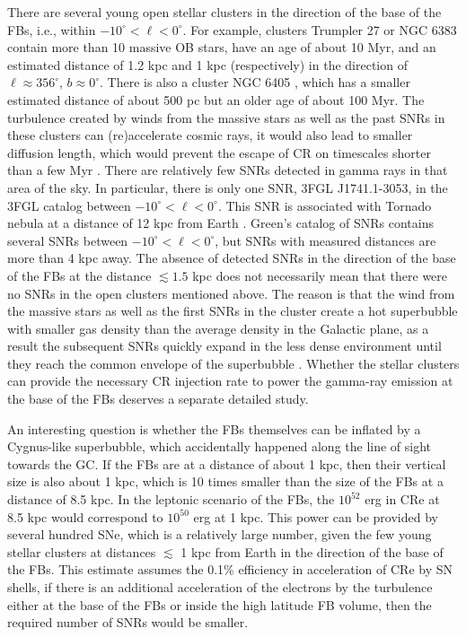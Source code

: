 There are several young open stellar clusters in the direction of the base of the FBs, i.e., within $-10^\circ < \ell  < 0^\circ$.
For example, clusters Trumpler 27 \citep{1977ApJ...215..106M} or NGC 6383 \citep{1978MNRAS.184..661L}
contain more than 10 massive OB stars, have an age of about 10 Myr, and an estimated distance of 1.2 kpc and 1 kpc (respectively) 
in the direction of $\ell \approx 356^\circ$, $b \approx 0^\circ$.
There is also a cluster NGC 6405 \citep{1959ZA.....47...15R}, which has a smaller estimated distance of about 500 pc
but an older age of about 100 Myr.
The turbulence created by winds from the massive stars as well as the past SNRs in these clusters can (re)accelerate cosmic rays,
it would also lead to smaller diffusion length, which would prevent the escape of CR on timescales shorter than a few Myr \citep{2011Sci...334.1103A}.
There are relatively few SNRs detected in gamma rays in that area of the sky.
In particular, there is only one SNR, 3FGL J1741.1-3053, in the 3FGL catalog \citep{2015ApJS..218...23A}
between $-10^\circ < \ell  < 0^\circ$.
This SNR is associated with Tornado nebula at a distance of 12 kpc from Earth \citep{2013ApJ...774...36C}.
Green's catalog of SNRs \citep{2014BASI...42...47G, 2017Green} contains several SNRs between $-10^\circ < \ell  < 0^\circ$,
but SNRs with measured distances are more than 4 kpc away.
The absence of detected SNRs in the direction of the base of the FBs at the distance $\lesssim 1.5$ kpc 
does not necessarily mean that there were no SNRs in the open clusters mentioned above.
The reason is that the wind from the massive stars as well as the first SNRs in the cluster create a hot superbubble
with smaller gas density than the average density in the Galactic plane, as a result the subsequent SNRs quickly expand
in the less dense environment until they reach the common envelope of the superbubble 
\citep[see, e.g., simulations of the formation of the local hot superbubble and the possible scenario of the Loop I formation in][]%
{2016Natur.532...73B, 2017A&A...604A..81S, 2018Galax...6...26S}.
Whether the stellar clusters can provide the necessary CR injection rate to power the gamma-ray emission at the base
of the FBs deserves a separate detailed study.

An interesting question is whether the FBs themselves can be inflated by a Cygnus-like superbubble,
which accidentally happened along the line of sight towards the GC.
If the FBs are at a distance of about 1 kpc, then their vertical size is also about 1 kpc,
which is 10 times smaller than the size of the FBs at a distance of 8.5 kpc.
In the leptonic scenario of the FBs, the $10^{52}$ erg in CRe at 8.5 kpc \citep{2014ApJ...793...64A}
would correspond to $10^{50}$ erg at 1 kpc.
This power can be provided by several hundred SNe, which is a relatively large number, given the few young stellar 
clusters at distances $\lesssim$ 1 kpc from Earth in the direction of the base of the FBs.
This estimate assumes the 0.1\% efficiency in acceleration of CRe by SN shells,
if there is an additional acceleration of the electrons by the turbulence either at the base of the FBs
or inside the high latitude FB volume, then the required number of SNRs would be smaller.

